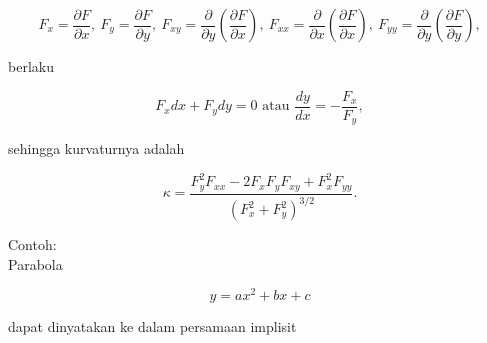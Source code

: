 \documentclass[a4paper,10pt]{article}
\begin{document}
\begin{eulernotebook}
\begin{eulercomment}
\begin{eulercomment}
\begin{eulercomment}
\begin{eulercomment}
\begin{eulercomment}
\begin{eulercomment}
\begin{eulercomment}
\begin{eulercomment}
\begin{eulercomment}
\begin{eulercomment}
\begin{eulercomment}
\begin{eulercomment}
\begin{eulercomment}
\begin{eulercomment}
\begin{eulercomment}
\begin{eulercomment}
\begin{eulercomment}
\end{eulercomment}
\begin{eulerformula}
\[
F_x=\frac{\partial F}{\partial x},\ F_y=\frac{\partial F}{\partial y},\ F_{xy}=\frac{\partial}{\partial y}\left(\frac{\partial F}{\partial x}\right),\ F_{xx}=\frac{\partial}{\partial x}\left(\frac{\partial F}{\partial x}\right),\ F_{yy}=\frac{\partial}{\partial y}\left(\frac{\partial F}{\partial y}\right),
\]
\end{eulerformula}
\begin{eulercomment}
berlaku

\end{eulercomment}
\begin{eulerformula}
\[
F_x dx+ F_y dy = 0\text{ atau } \frac{dy}{dx}=-\frac{F_x}{F_y},
\]
\end{eulerformula}
\begin{eulercomment}
sehingga kurvaturnya adalah

\end{eulercomment}
\begin{eulerformula}
\[
\kappa =\frac {F_y^2F_{xx}-2F_xF_yF_{xy}+F_x^2F_{yy}}{\left(F_x^2+F_y^2\right)^{3/2}}.
\]
\end{eulerformula}
\begin{eulercomment}
Contoh:\\
Parabola

\end{eulercomment}
\begin{eulerformula}
\[
y=ax^2+bx+c
\]
\end{eulerformula}
\begin{eulercomment}
dapat dinyatakan ke dalam persamaan implisit


\end{eulercomment}
\end{eulercomment}
\end{eulercomment}
\end{eulercomment}
\end{eulercomment}
\end{eulercomment}
\end{eulercomment}
\end{eulercomment}
\end{eulercomment}
\end{eulercomment}
\end{eulercomment}
\end{eulercomment}
\end{eulercomment}
\end{eulercomment}
\end{eulercomment}
\end{eulercomment}
\end{eulercomment}
\end{eulernotebook}
\end{document}
